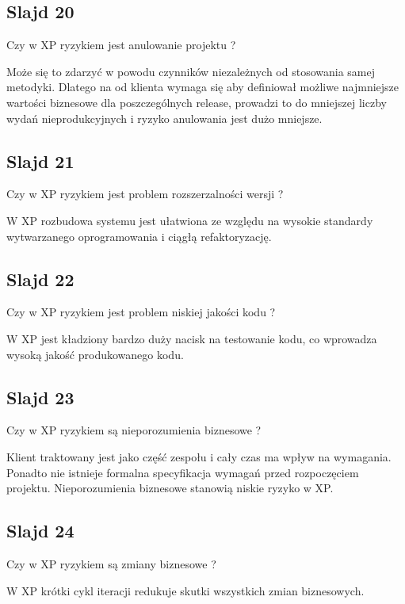 \documentclass[a4paper,15pt]{article}
\begin{document}
\subsection{Slajd 20}
\begin{framed}
Czy w XP ryzykiem jest anulowanie projektu ?
\end{framed}
Może się to zdarzyć w powodu czynników niezależnych od stosowania samej metodyki. Dlatego na od klienta wymaga się aby definiował możliwe najmniejsze wartości biznesowe dla poszczególnych release, prowadzi to do mniejszej liczby wydań nieprodukcyjnych i ryzyko anulowania jest dużo mniejsze. 

\subsection{Slajd 21}
\begin{framed}
Czy w XP ryzykiem jest problem rozszerzalności wersji ?
\end{framed}
W XP rozbudowa systemu jest ułatwiona ze względu na wysokie standardy wytwarzanego oprogramowania i ciągłą refaktoryzację.

\subsection{Slajd 22}
\begin{framed}
Czy w XP ryzykiem jest problem niskiej jakości kodu ?
\end{framed}
W XP jest kładziony bardzo duży nacisk na testowanie kodu, co wprowadza wysoką jakość produkowanego kodu.

\subsection{Slajd 23}
\begin{framed}
Czy w XP ryzykiem są nieporozumienia biznesowe ?
\end{framed}
Klient traktowany jest jako część zespołu i cały czas ma wpływ na wymagania. Ponadto nie istnieje formalna specyfikacja wymagań przed rozpoczęciem projektu. Nieporozumienia biznesowe stanowią niskie ryzyko w XP.

\subsection{Slajd 24}
\begin{framed}
Czy w XP ryzykiem są zmiany biznesowe ?
\end{framed}
W XP krótki cykl iteracji redukuje skutki wszystkich zmian biznesowych.
\end{document}
